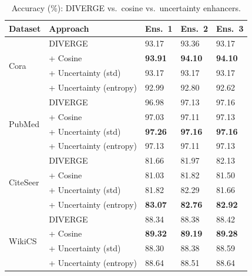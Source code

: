 \documentclass{article}
\begin{document}
\begin{table}[htbp]
\centering
\caption{Accuracy (\%): DIVERGE vs.\ cosine vs.\ uncertainty enhancers.}
\label{tab:accuracy_ensemble_after_enhancers}
\small
\begin{tabularx}{\textwidth}{l l *{3}{X}}
\toprule
Dataset & Approach & Ens.\ 1 & Ens.\ 2 & Ens.\ 3 \\
\midrule
\multirow{4}{*}{Cora}
 & DIVERGE & 93.17 & 93.36 & 93.17 \\
 & + Cosine & \textbf{93.91} & \textbf{94.10} & \textbf{94.10} \\
 & + Uncertainty (std) & 93.17 & 93.17 & 93.17 \\
 & + Uncertainty (entropy) & 92.99 & 92.80 & 92.62 \\
\midrule
\multirow{4}{*}{PubMed}
 & DIVERGE & 96.98 & 97.13 & 97.16 \\
 & + Cosine & 97.03 & 97.11 & 97.13 \\
 & + Uncertainty (std) & \textbf{97.26} & \textbf{97.16} & \textbf{97.16} \\
 & + Uncertainty (entropy) & 97.13 & 97.11 & 97.13 \\
\midrule
\multirow{4}{*}{CiteSeer}
 & DIVERGE & 81.66 & 81.97 & 82.13 \\
 & + Cosine & 81.03 & 81.82 & 81.50 \\
 & + Uncertainty (std) & 81.82 & 82.29 & 81.66 \\
 & + Uncertainty (entropy) & \textbf{83.07} & \textbf{82.76} & \textbf{82.92} \\
\midrule
\multirow{4}{*}{WikiCS}
 & DIVERGE & 88.34 & 88.38 & 88.42 \\
 & + Cosine & \textbf{89.32} & \textbf{89.19} & \textbf{89.28} \\
 & + Uncertainty (std) & 88.30 & 88.38 & 88.59 \\
 & + Uncertainty (entropy) & 88.64 & 88.51 & 88.64 \\
\bottomrule
\end{tabularx}
\end{table}
\end{document}
